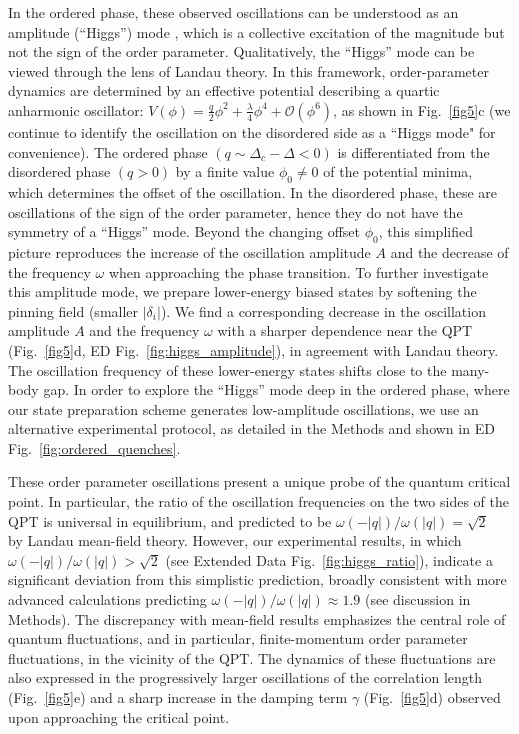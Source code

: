 \documentclass[reprint,twocolumn,secnumarabic,amssymb, aps, prx]{revtex4-2}
\begin{document}
In the ordered phase, these observed oscillations can be understood as an amplitude (``Higgs'') mode \cite{pekker2015amplitude}, which is a collective excitation of the magnitude but not the sign of the order parameter. Qualitatively, the ``Higgs'' mode can be viewed through the lens of Landau theory. In this framework, order-parameter dynamics are determined by an effective potential describing a quartic anharmonic oscillator: $V(\phi)=\frac{q}{2}\phi^2 + \frac{\lambda}{4}\phi^4 + \mathcal{O}(\phi^6)$, as shown in Fig.~\ref{fig5}c (we continue to identify the oscillation on the disordered side as a ``Higgs mode" for convenience). The ordered phase $(q\sim \Delta_c-\Delta <0)$ is differentiated from the disordered phase $(q>0)$ by a finite value $\phi_0\neq 0$ of the potential minima, which determines the offset of the oscillation. In the disordered phase, these are oscillations of the sign of the order parameter, hence they do not have the symmetry of a ``Higgs'' mode. Beyond the changing offset $\phi_0$, this simplified picture reproduces the increase of the oscillation amplitude $A$ and the decrease of the frequency $\omega$ when approaching the phase transition. To further investigate this amplitude mode, we prepare lower-energy biased states by softening the pinning field (smaller $|\delta_i|$). We find a corresponding decrease in the oscillation amplitude $A$ and the frequency $\omega$ with a sharper dependence near the QPT (Fig.~\ref{fig5}d, ED Fig.~\ref{fig:higgs_amplitude}), in agreement with Landau theory. The oscillation frequency of these lower-energy states shifts close to the many-body gap. In order to explore the ``Higgs'' mode deep in the ordered phase, where our state preparation scheme generates low-amplitude oscillations, we use an alternative experimental protocol, as detailed in the Methods and shown in ED Fig.~\ref{fig:ordered_quenches}.

These order parameter oscillations present a unique probe of the quantum critical point. In particular, the ratio of the oscillation frequencies on the two sides of the QPT is universal in equilibrium, and predicted to be $\omega(-|q|) / \omega(|q|)=\sqrt{2}$~\cite{sachdev2009exotic} by Landau mean-field theory. However, our experimental results, in which $\omega(-|q|) / \omega(|q|)>\sqrt{2}$ (see Extended Data Fig.~\ref{fig:higgs_ratio}), indicate a significant deviation from this simplistic prediction, broadly consistent with more advanced calculations predicting $\omega(-|q|) / \omega(|q|)\approx 1.9$ (see discussion in Methods). The discrepancy with mean-field results emphasizes the central role of quantum fluctuations, and in particular, finite-momentum order parameter fluctuations, in the vicinity of the QPT. The dynamics of these fluctuations are also expressed in the progressively larger oscillations of the correlation length (Fig.~\ref{fig5}e) and a sharp increase in the damping term $\gamma$ (Fig.~\ref{fig5}d) observed upon approaching the critical point.
\end{document}
